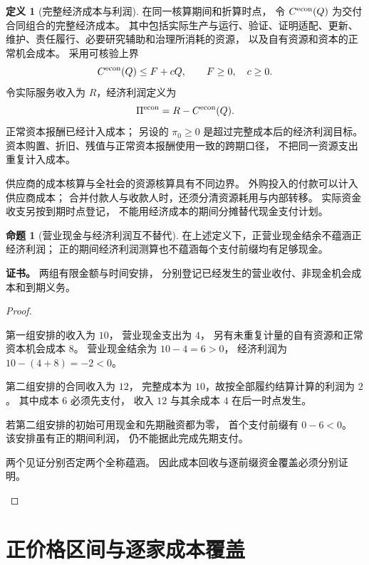 \documentclass[UTF8,12pt,a4paper,openany,fontset=none,zihao=false]{ctexrep}
\theoremstyle{definition}
\newtheorem{definition}{定义}[chapter]
\newtheorem{proposition}{命题}[chapter]
\newenvironment{certificate}{\par\noindent\textbf{证书。}\ignorespaces}{\par}
\newcommand{\1}{\mathbf 1}
\begin{document}
\begin{definition}[完整经济成本与利润]
\label{market:full-cost}
在同一核算期间和折算时点，
令 \(C^{\rm econ}(Q)\) 为交付合同组合的完整经济成本。
其中包括实际生产与运行、验证、证明适配、更新、
维护、责任履行、必要研究辅助和治理所消耗的资源，
以及自有资源和资本的正常机会成本。
采用可核验上界
\[
 C^{\rm econ}(Q)\le F+cQ,
 \qquad F\ge0,\quad c\ge0.
\]
令实际服务收入为 \(R\)，经济利润定义为
\[
 \Pi^{\rm econ}=R-C^{\rm econ}(Q).
\]
正常资本报酬已经计入成本；
另设的 \(\pi_0\ge0\) 是超过完整成本后的经济利润目标。
资本购置、折旧、残值与正常资本报酬使用一致的跨期口径，
不把同一资源支出重复计入成本。
\end{definition}

供应商的成本核算与全社会的资源核算具有不同边界。
外购投入的付款可以计入供应商成本；
合并付款人与收款人时，还须分清资源耗用与内部转移。
实际资金收支另按到期时点登记，
不能用经济成本的期间分摊替代现金支付计划。

\begin{proposition}[营业现金与经济利润互不替代]
\label{market:cash-not-profit}
在上述定义下，正营业现金结余不蕴涵正经济利润；
正的期间经济利润测算也不蕴涵每个支付前缀均有足够现金。
\end{proposition}
\begin{certificate}
两组有限金额与时间安排，
分别登记已经发生的营业收付、非现金机会成本和到期义务。
\end{certificate}
\begin{proof}
\begin{semanticsteps}
\item 第一组安排的收入为 \(10\)，
营业现金支出为 \(4\)，
另有未重复计量的自有资源和正常资本机会成本 \(8\)。
营业现金结余为 \(10-4=6>0\)，
经济利润为 \(10-(4+8)=-2<0\)。
\item 第二组安排的合同收入为 \(12\)，
完整成本为 \(10\)，故按全部履约结算计算的利润为 \(2\)。
其中成本 \(6\) 必须先支付，
收入 \(12\) 与其余成本 \(4\) 在后一时点发生。
\item 若第二组安排的初始可用现金和先期融资都为零，
首个支付前缀有 \(0-6<0\)。
该安排虽有正的期间利润，
仍不能据此完成先期支付。
\item 两个见证分别否定两个全称蕴涵。
因此成本回收与逐前缀资金覆盖必须分别证明。
\end{semanticsteps}
\end{proof}

\section{正价格区间与逐家成本覆盖}
\end{document}
